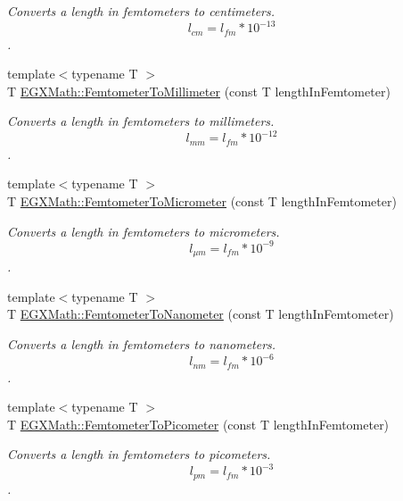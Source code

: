 \begin{DoxyCompactItemize}
\begin{DoxyCompactList}\small\item\em Converts a length in femtometers to centimeters. \[ l_{cm}=l_{fm} * 10^{-13} \]. \end{DoxyCompactList}\item 
{\footnotesize template$<$typename T $>$ }\\T \mbox{\hyperlink{group___e_g_x_math-_conversions-_length_conversions-_femtometer-_s_i_ga2e6d6c0aad4502554b05f677ff248bc8}{E\+G\+X\+Math\+::\+Femtometer\+To\+Millimeter}} (const T length\+In\+Femtometer)
\begin{DoxyCompactList}\small\item\em Converts a length in femtometers to millimeters. \[ l_{mm}=l_{fm} * 10^{-12} \]. \end{DoxyCompactList}\item 
{\footnotesize template$<$typename T $>$ }\\T \mbox{\hyperlink{group___e_g_x_math-_conversions-_length_conversions-_femtometer-_s_i_gac965667884f7a3449072effb83260fe8}{E\+G\+X\+Math\+::\+Femtometer\+To\+Micrometer}} (const T length\+In\+Femtometer)
\begin{DoxyCompactList}\small\item\em Converts a length in femtometers to micrometers. \[ l_{\mu m}=l_{fm} * 10^{-9} \]. \end{DoxyCompactList}\item 
{\footnotesize template$<$typename T $>$ }\\T \mbox{\hyperlink{group___e_g_x_math-_conversions-_length_conversions-_femtometer-_s_i_ga61aa82ad734717567c959f0d4e840076}{E\+G\+X\+Math\+::\+Femtometer\+To\+Nanometer}} (const T length\+In\+Femtometer)
\begin{DoxyCompactList}\small\item\em Converts a length in femtometers to nanometers. \[ l_{nm}=l_{fm} * 10^{-6} \]. \end{DoxyCompactList}\item 
{\footnotesize template$<$typename T $>$ }\\T \mbox{\hyperlink{group___e_g_x_math-_conversions-_length_conversions-_femtometer-_s_i_gadfcd6b374d4134cad0ac1ce7a8e50509}{E\+G\+X\+Math\+::\+Femtometer\+To\+Picometer}} (const T length\+In\+Femtometer)
\begin{DoxyCompactList}\small\item\em Converts a length in femtometers to picometers. \[ l_{pm}=l_{fm} * 10^{-3} \]. \end{DoxyCompactList}\item 

\end{DoxyCompactItemize}
